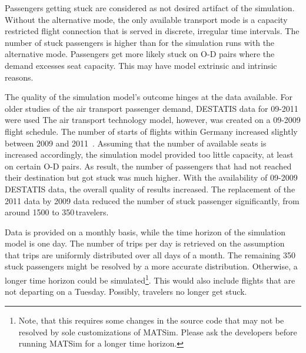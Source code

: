 %
Passengers getting stuck are considered as not desired artifact of the simulation. 
Without the alternative mode, the only available transport mode is a capacity restricted flight connection that is served in discrete, irregular time intervals. 
The number of stuck passengers is higher than for the simulation runs with the alternative mode. 
Passengers get more likely stuck on O-D pairs where the demand excesses seat capacity. 
This may have model extrinsic and intrinsic reasons. 

The quality of the simulation model's outcome hinges at the data available.  
For older studies of the air transport passenger demand, DESTATIS data for 09-2011 were used
The air transport technology model, however, was created on a 09-2009 flight schedule.  
The number of starts of flights within Germany increased slightly between 2009 and 2011~\citep[][p.~23]{DLR2011Luftverkehrsbericht}. 
Assuming that the number of available seats is increased accordingly, the simulation model provided too little capacity, at least on certain O-D pairs. 
As result, the number of passengers that had not reached their destination but got stuck was much higher. 
With the availability of 09-2009 DESTATIS data, the overall quality of results increased.  
The replacement of the 2011 data by 2009 data reduced the number of stuck passenger significantly, from around 1500 to 350\,travelers. 

Data is provided on a monthly basis, while the time horizon of the simulation model is one day. 
The number of trips per day is retrieved on the assumption that trips are uniformly distributed over all days of a month.  
The remaining 350\,stuck passengers might be resolved by a more accurate distribution. 
Otherwise, a longer time horizon could be simulated\footnote{Note, that this requires some changes in the source code that may not be resolved by sole customizations of MATSim. Please ask the developers before running MATSim for a longer time horizon.}. 
This would also include flights that are not departing on a Tuesday. 
Possibly, travelers no longer get stuck. 

